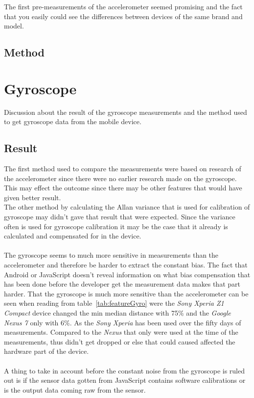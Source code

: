 The first pre-measurements of the accelerometer seemed promising and the fact that you easily could see the differences between devices of the same brand and model. 
\subsection{Method}

\section{Gyroscope}
Discussion about the result of the gyroscope measurements and the method used to get gyroscope data from the mobile device.
\subsection{Result}
The first method used to compare the measurements were based on research of the accelerometer since there were no earlier research made on the gyroscope. This may effect the outcome since there may be other features that would have given better result. \\
The other method by calculating the Allan variance that is used for calibration of gyroscope may didn't gave that result that were expected. Since the variance often is used for gyroscope calibration it may be the case that it already is calculated and compensated for in the device.\\
\\
The gyroscope seems to much more sensitive in measurements than the accelerometer and therefore be harder to extract the constant bias. The fact that Android or JavaScript doesn't reveal information on what bias compensation that has been done before the developer get the measurement data makes that part harder. That the gyroscope is much more sensitive than the accelerometer can be seen when reading from table~\ref{tab:featureGyro} were the \textit{Sony Xperia Z1 Compact} device changed the min median distance with 75\% and the \textit{Google Nexus 7} only with 6\%. As the \textit{Sony Xperia} has been used over the fifty days of measurements. Compared to the \textit{Nexus} that only were used at the time of the measurements, thus didn't get dropped or else that could caused affected the hardware part of the device. \\
\\
A thing to take in account before the constant noise from the gyroscope is ruled out is if the sensor data gotten from JavaScript contains software calibrations or is the output data coming raw from the sensor. \\
